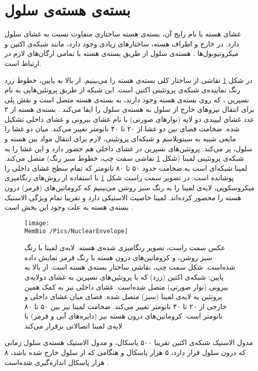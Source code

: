 \setRL


\section{\label{sec:nuclearenvelope}
بسته‌ی هسته‌ی سلول
}
غشای هسته یا نام رایج آن، بسته‌ی هسته
ساختاری متفاوت نسبت به غشای سلول دارد. در خارج و اطراف هسته، ساختارهای زیادی وجود دارد، مانند شبکه‌ی اکتین
 و میکروتیوبول‌ها
. هسته‌ی سلول از طریق بسته‌ی هسته با تمامی‌ ارگان‌های لازم در ارتباط است.

در شکل 
\ref{fig:nuclearenvelope}
نقاشی از ساختار کلی بسته‌ی هسته را می‌بینیم. از بالا به پایین، خطوط زرد رنگ نماینده‌ی شبکه‌ی پروتئینی اکتین است. این شبکه از طریق پروتئین‌هایی به نام نسپرین
، که روی بسته‌ی هسته وجود دارند، به بسته‌ی هسته متصل است و نقش پلی برای انتقال نیرو‌های خارج از سلول به هسته‌ی سلول را ایفا می‌کند
\cite{Lammerding2011}. بسته‌ی هسته از ۲ عدد غشای لیپیدی دو لایه (نوارهای صورتی) با نام غشای بیرونی و غشای داخلی تشکیل شده. ضخامت فضای بین دو غشا از ۲۰ تا ۴۰ نانومتر تغییر می‌کند. میان دو غشا را مایعی شبیه به سیتوپلاسم و شبکه‌ای پروتئینی، لازم برای انتقال مواد بین هسته و سلول، پر می‌کند. پروتئین‌های نسپرین  در غشای داخلی هم حضور دارد و این غشا را به شبکه‌ی پروتئینی لمینا
(شکل
\ref{fig:nuclearenvelope}
نقاشی سمت چپ، خطوط سبز‌ رنگ) متصل می‌کند. لمینا‌ شبکه‌ای است به ضخامت حدود ۵۰ تا ۸۰ نانومتر که تمام سطح غشای داخلی را پوشانده است. در تصویر سمت راست شکل 
\ref{fig:nuclearenvelope}
با استفاده از روش‌های رنگامیزی میکروسکوپی، لایه‌ی لمینا را به رنگ سبز روشن می‌بینیم که کروماتین‌های (قرمز) درون هسته را محصور کرده‌اند. لمینا خاصیت الاستیکی دارد و تقریبا تمام ویژگی الاستیک بسته‌ی هسته به علت وجود این بخش است
\cite{Steensel2017wd}
. 


\begin{figure}[h]
\begin{center}
\texttt{[image: \\MemBio /Pics/NuclearEnvelope]}
\caption{
عکس سمت راست، تصویر رنگامیزی شده‌ی هسته. لایه‌ی لمینا با رنگ سبز روشن، و کروماتین‌های درون هسته با رنگ قرمز نمایش داده‌ شده‌است. شکل سمت چپ، نقاشی ساختار بسته‌ی هسته است. از بالا به پایین: شبکه‌ی اکتین (زرد) که با پروتئین‌های نسپرین به غشای دولایه‌ی بیرونی (نوار صورتی) متصل شده‌است. غشای داخلی نیز به کمک همین پروتئین به لایه‌ی لمینا (سبز) متصل شده. فضای میان غشای داخلی و خارجی از ۲۰ تا ۴۰ نانومتر تغییر می‌کند. ضخامت لمینا نیز بین ۵۰ تا ۸۰ نانومتر است. کروماتین‌های درون هسته نیز (دایره‌های آبی و قرمز) با لایه‌ی لمینا اتصالاتی برقرار می‌کند. 
}
\label{fig:nuclearenvelope}
\end{center}
\end{figure}
مدول الاستیک شبکه‌ی اکتین تقریبا ۵۰۰ پاسکال، و مدول الاستیک هسته‌ی سلول زمانی که درون سلول قرار دارد، ۵ هزار پاسکال و هنگامی ‌که از سلول خارج شده باشد، ۸ هزار پاسکال اندازه‌گیری شده‌است
\cite{Dahl2004, CAILLE2002177}.







